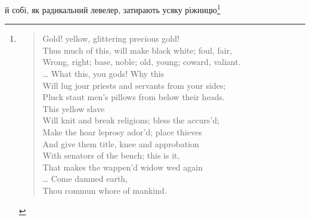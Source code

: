 й собі, як радикальний левелер, затирають усяку ріжницю\footnote{
\begin{verse}
\vspace{-\dimexpr\baselineskip+\topsep}
Gold! yellow, glittering precious gold! \\
Thus much of this, will make black white; foul, fair, \\
Wrong, right; base, noble; old, young; coward, valiant. \\
\dots{} What this, you gods! Why this \\
Will lug jour priests and servants from your sides; \\
Pluck staut men’s pillows from below their heads. \\
This yellow slave \\
Will knit and break religions; bless the accurs'd; \\
Make the hoar leprosy ador’d; place thieves \\
And give them title, knee and approbation \\
With senators of the bench; this is it, \\
That makes the wappen’d widow wed again \\
\dots{} Come damned earth, \\
Thou commun whore of mankind. \\


\end{verse}}
